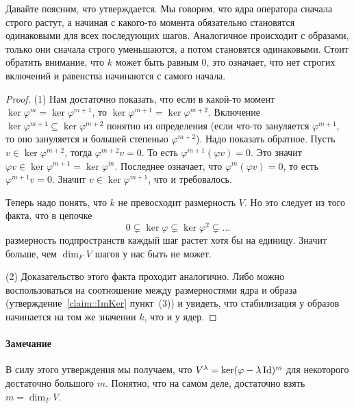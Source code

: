 Давайте поясним, что утверждается. Мы говорим, что ядра оператора сначала строго растут, а начиная с какого-то момента обязательно становятся одинаковыми для всех последующих шагов. Аналогичное происходит с образами, только они сначала строго уменьшаются, а потом становятся одинаковыми. Стоит обратить внимание, что $k$ может быть равным $0$, это означает, что нет строгих включений и равенства начинаются с самого начала.

\begin{proof}

(1) Нам достаточно показать, что если в какой-то момент $\ker \varphi^m = \ker\varphi^{m+1}$, то $\ker \varphi^{m+1} = \ker\varphi^{m+2}$. Включение $\ker \varphi^{m+1}\subseteq \ker \varphi^{m+2}$ понятно из определения (если что-то зануляется $\varphi^{m+1}$, то оно зануляется и большей степенью $\varphi^{m+2}$). Надо показать обратное. Пусть $v\in \ker \varphi^{m+2}$, тогда $\varphi^{m+2}v = 0$. То есть $\varphi^{m+1}(\varphi v) = 0$. Это значит $\varphi v \in \ker \varphi^{m+1} = \ker \varphi^m$. Последнее означает, что $\varphi^m(\varphi v) = 0$, то есть $\varphi^{m+1} v = 0$. Значит $v\in \ker \varphi^{m+1}$, что и требовалось.

Теперь надо понять, что $k$ не превосходит размерность $V$. Но это следует из того факта, что в цепочке
\[
0\subsetneq \ker \varphi \subsetneq\ker\varphi^2\subsetneq \ldots
\]
размерность подпространств каждый шаг растет хотя бы на единицу. Значит больше, чем $\dim_F V$ шагов у нас быть не может.

(2) Доказательство этого факта проходит аналогично. Либо можно воспользоваться на соотношение между размерностями ядра и образа (утверждение~\ref{claim::ImKer} пункт~(3)) и увидеть, что стабилизация у образов начинается на том же значении $k$, что и у ядер.
\end{proof}

\paragraph{Замечание}


В силу этого утверждения мы получаем, что $V^\lambda = \ker (\varphi - \lambda \operatorname{Id})^m$ для некоторого достаточно большого $m$. Понятно, что на самом деле, достаточно взять $m = \dim_F V$.


